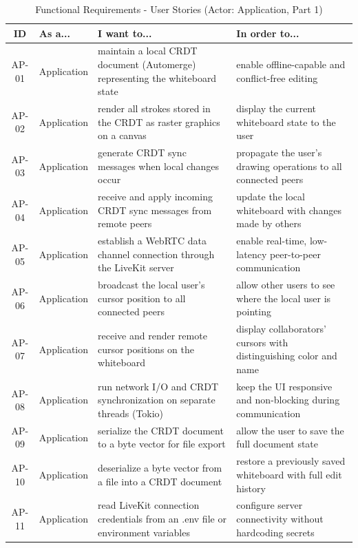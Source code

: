 \documentclass[a4paper,11pt,twoside]{report}
\theoremstyle{definition}
\begin{document}
\begin{table}[H]
	\centering
	\caption{Functional Requirements - User Stories (Actor: Application, Part 1)}
	\begin{tabular}{|c|p{}|p{}|p{}|}
		\hline
		\textbf{ID} & \textbf{As a...} & \textbf{I want to...} & \textbf{In order to...} \\
		\hline
		AP-01 & Application & maintain a local CRDT document (Automerge) representing the whiteboard state & enable offline-capable and conflict-free editing \\
		\hline
		AP-02 & Application & render all strokes stored in the CRDT as raster graphics on a canvas & display the current whiteboard state to the user \\
		\hline
		AP-03 & Application & generate CRDT sync messages when local changes occur & propagate the user's drawing operations to all connected peers \\
		\hline
		AP-04 & Application & receive and apply incoming CRDT sync messages from remote peers & update the local whiteboard with changes made by others \\
		\hline
		AP-05 & Application & establish a WebRTC data channel connection through the LiveKit server & enable real-time, low-latency peer-to-peer communication \\
		\hline
		AP-06 & Application & broadcast the local user's cursor position to all connected peers & allow other users to see where the local user is pointing \\
		\hline
		AP-07 & Application & receive and render remote cursor positions on the whiteboard & display collaborators' cursors with distinguishing color and name \\
		\hline
		AP-08 & Application & run network I/O and CRDT synchronization on separate threads (Tokio) & keep the UI responsive and non-blocking during communication \\
		\hline
		AP-09 & Application & serialize the CRDT document to a byte vector for file export & allow the user to save the full document state \\
		\hline
		AP-10 & Application & deserialize a byte vector from a file into a CRDT document & restore a previously saved whiteboard with full edit history \\
		\hline
		AP-11 & Application & read LiveKit connection credentials from an .env file or environment variables & configure server connectivity without hardcoding secrets \\
		\hline
	\end{tabular}
	\label{tab:user-stories-application-1}
\end{table}
\end{document}
